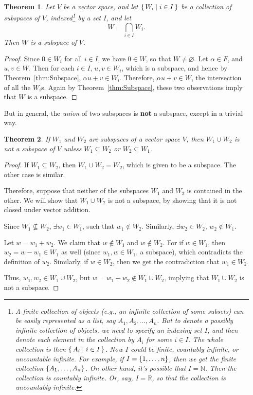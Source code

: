 \documentclass[svgnames]{article}
\newtheorem{Theorem}{Theorem}[section]
\theoremstyle{definition}
\theoremstyle{remark}
\newcommand{\newterm}[1]{{\color{alertcolor} #1}}
\begin{document}
\begin{Theorem}\label{thm:SubspInt}
Let $V$ be a vector space, and let $\qty{\, W_i \mid i \in I \,}$ be a collection of subspaces of $V$, indexed\footnote{
	A finite collection of objects (e.g., an infinite collection of some subsets) can be easily represented as a list, say $A_1, A_2, \ldots, A_n$. But to denote a possibly infinite collection of objects, we need to specify an \newterm{indexing set} $I$, and then denote each element in the collection by $A_i$ for some $i \in I$. The whole collection is then $\qty{\, A_i \mid i \in I \,}$. Now $I$ could be finite, countably infinite, or uncountable infinite. For example, if $I = \qty{1, \ldots, n}$, then we get the finite collection $\qty{A_1, \ldots, A_n}$. On other hand, it's possible that $I = \mathbb N$. Then the collection is countably infinite. Or, say, $I = \mathbb R$, so that the collection is uncountably infinite.
}
by a set $I$, and let
\begin{equation*}
	W = \bigcap_{i \in I} W_i.
\end{equation*}
Then $W$ is a subspace of $V$.
\end{Theorem}
\begin{proof}
Since $0 \in W_i$ for all $i \in I$, we have $0 \in W$, so that $W \ne \varnothing$. Let $\alpha \in F$, and $u, v \in W$.
Then for each $i \in I$, $u, v \in W_i$, which is a subspace, and hence by Theorem~\ref{thm:Subspace}, $\alpha u + v \in W_i$. Therefore, $\alpha u + v \in W$, the intersection of all the $W_i$s. Again by Theorem~\ref{thm:Subspace}, these two observations imply that $W$ is a subspace.
\end{proof}

\noindent But in general, the \emph{union} of two subspaces is \textbf{not} a subspace, except in a trivial way.

\begin{Theorem}
If $W_1$ and $W_2$ are subspaces of a vector space $V$, then $W_1 \cup W_2$ is not a subspace of $V$ unless $W_1 \subseteq W_2$ or $W_2 \subseteq W_1$.
\end{Theorem}
\begin{proof}
If $W_1 \subseteq W_2$, then $W_1 \cup W_2 = W_2$, which is given to be a subspace. The other case is similar.

Therefore, suppose that neither of the subspaces $W_1$ and $W_2$ is contained in the other. We will show that $W_1 \cup W_2$ is not a subspace, by showing that it is not closed under vector addition.

Since $W_1 \not\subseteq W_2$, $\exists w_1 \in W_1$, such that $w_1 \notin W_2$. Similarly, $\exists w_2 \in W_2$, $w_2 \notin W_1$.

Let $w = w_1 + w_2$. We claim that $w \notin W_1$ and $w \notin W_2$. For if $w \in W_1$, then $w_2 = w - w_1 \in W_1$ as well (since $w_1, w \in W_1$, a subspace), which contradicts the definition of $w_2$. Similarly, if $w \in W_2$, then we get the contradiction that $w_1 \in W_2$.

Thus, $w_1, w_2 \in W_1 \cup W_2$, but $w = w_1 + w_2 \notin W_1 \cup W_2$, implying that $W_1 \cup W_2$ is not a subspace.
\end{proof}
\end{document}
